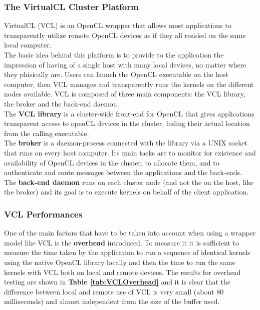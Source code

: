 \subsubsection{The VirtualCL Cluster Platform}
VirtualCL (VCL) is an OpenCL wrapper that allows most applications to transparently utilize remote OpenCL devices as if they all resided on the same local computer.\\
The basic idea behind this platform is to provide to the application the impression of having of a single host with many local devices, no matter where they phisically are. Users can launch the OpenCL executable on the host computer, then VCL manages and transparently runs the kernels on the different nodes available.
VCL is composed of three main components: the VCL library, the broker and the back-end daemon.\\
The \textbf{VCL library} is a cluster-wide front-end for OpenCL that gives applications transparent access to openCL devices in the cluster, hiding their actual location from the calling executable.\\
The \textbf{broker} is a daemon-process connected with the library via a UNIX socket that runs on every host computer. Its main tasks are to monitor for existence and availability of OpenCL devices in the cluster, to allocate them, and to authenticate and route messages between the applications and the back-ends.\\
The \textbf{back-end daemon} runs on each cluster node (and not the on the host, like the broker) and its goal is to execute kernels on behalf of the client application.

\subsubsection{VCL Performances}
One of the main factors that have to be taken into account when using a wrapper model like VCL is the \textbf{overhead} introduced. To measure it it is sufficient to measure the time taken by the application to run a sequence of identical kernels using the native OpenCL library locally and then the time to run the same kernels with VCL both on local and remote devices. The results for overhead testing are shown in \textbf{Table \ref{tab:VCLOverhead}} and it is clear that the difference between local and remote use of VCL is very small (about 80 milliseconds) and almost independent from the size of the buffer used.\\

